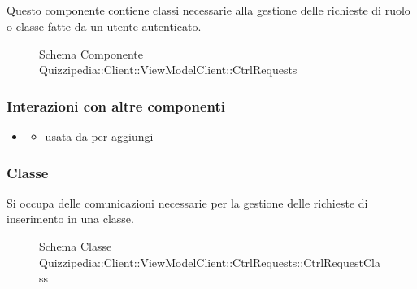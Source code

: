 \subsection{}
Questo componente contiene classi necessarie alla gestione delle richieste di ruolo o classe fatte da un utente autenticato.
\begin{figure}[H]
\centering
\noindent{}
\caption[Schema Componente Quizzipedia::Client::ViewModelClient::CtrlRequests]{Schema Componente Quizzipedia::Client::ViewModelClient::CtrlRequests}
\end{figure}
\subsubsection{Interazioni con altre componenti}
\begin{itemize}
\item {}
\begin{itemize}
\item usata da  per aggiungi
\end{itemize}
\end{itemize}
\subsubsection{Classe }
Si occupa delle comunicazioni necessarie per la gestione delle richieste di inserimento in una classe.
\begin{figure}[H]
\centering
\noindent{}
\caption[Schema Classe CtrlRequestClass]{Schema Classe Quizzipedia::Client::ViewModelClient::CtrlRequests::CtrlRequestClass}
\end{figure}
